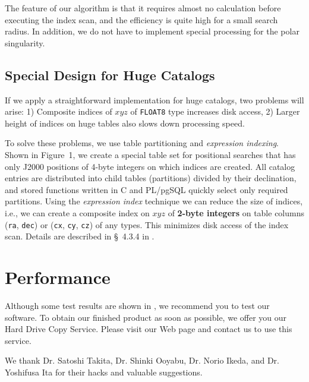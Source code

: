 The feature of our algorithm is that it requires almost no calculation before executing the index scan, and the efficiency is quite high for a small search radius. In addition, we do not have to implement special processing for the polar singularity.

\subsection{Special Design for Huge Catalogs}

\begin{figure}[t]
\end{figure}

If we apply a straightforward implementation for huge catalogs, two problems will arise: 1) Composite indices of $x$$y$$z$ of {\tt FLOAT8} type increases disk access, 2) Larger height of indices on huge tables also slows down processing speed.

To solve these problems, we use table partitioning and {\it expression indexing}. Shown in Figure~1, we create a special table set for positional searches that has only J2000 positions of 4-byte integers on which indices are created. All catalog entries are distributed into child tables (partitions) divided by their declination, and stored functions written in C and PL/pgSQL quickly select only required partitions. Using the {\it expression index} technique we can reduce the size of indices, i.e., we can create a composite index on $x$$y$$z$ of {\bf 2-byte integers} on table columns ({\tt ra}, {\tt dec}) or ({\tt cx}, {\tt cy}, {\tt cz}) of any types. This minimizes disk access of the index scan. Details are described in \S~4.3.4 in \citet{yam_2011a}.


\section{Performance}

Although some test results are shown in \citet{yam_2011a}, we recommend you to test our software. To obtain our finished product as soon as possible, we offer you our Hard Drive Copy Service. Please visit our Web page and contact us to use this service. 

\acknowledgements We thank 
Dr. Satoshi Takita, Dr. Shinki Ooyabu, Dr. Norio Ikeda, and Dr. Yoshifusa Ita for their hacks and valuable suggestions.



